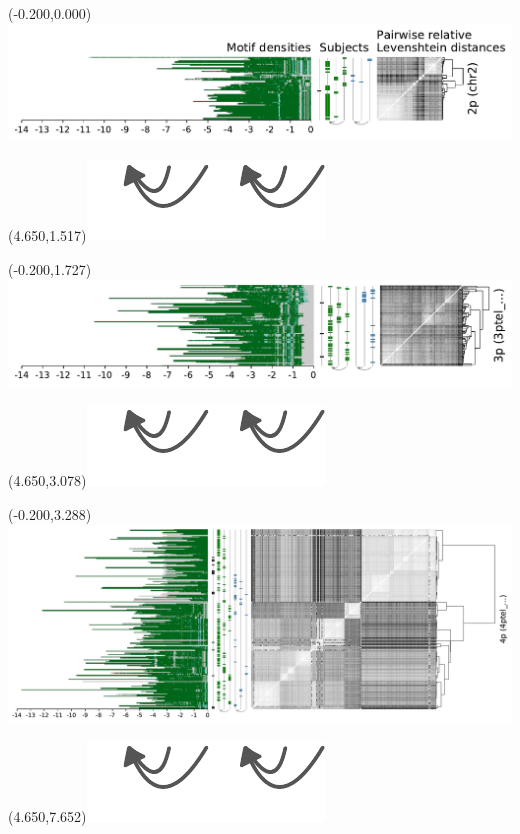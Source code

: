\documentclass{article}
\begin{document}
\begin{textblock}{13}(-0.200,0.000)\includegraphics{Figure_4/chr2.pdf}\end{textblock}
\begin{textblock}{13}(4.650,1.517)\includegraphics[width=.81in,keepaspectratio]{Figure_4/fatter-arrows.pdf}\end{textblock}
\begin{textblock}{13}(-0.200,1.727)\includegraphics{Figure_4/3ptel_1-500K_1_12_12.pdf}\end{textblock}
\begin{textblock}{13}(4.650,3.078)\includegraphics[width=.81in,keepaspectratio]{Figure_4/fatter-arrows.pdf}\end{textblock}
\begin{textblock}{13}(-0.200,3.288)\includegraphics{Figure_4/4ptel_1-500K_1_12_12.pdf}\end{textblock}
\begin{textblock}{13}(4.650,7.652)\includegraphics[width=.81in,keepaspectratio]{Figure_4/fatter-arrows.pdf}\end{textblock}
\end{document}
